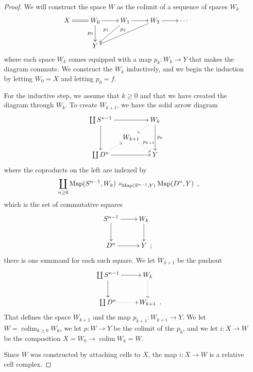 \documentclass{amsart}
\numberwithin{equation}{section}
\theoremstyle{slplain}
\theoremstyle{definition}
\theoremstyle{remark}
\DeclareMathOperator*{\colim}{colim}
\DeclareMathOperator{\Map}{Map}
\newcommand{\CofSquares}{%
  \mappullback{(S^{n-1}, W_{k})}
  {(S^{n-1}, Y)}
  {(D^{n}, Y)}%
}%
\newcommand{\pullback}[3]{#1\mathbin{\mathord{\times}_{\!#2}}#3}
\newcommand{\mappullback}[3]{\pullback{\Map#1}{\Map#2}{\Map#3}}
\newcommand{\Comma}{\rlap{\enspace ,}}
\newcommand{\Period}{\rlap{\enspace .}}
\newcommand{\Semicolon}{\rlap{\enspace ;}}
\begin{document}
\begin{proof}
  We will construct the space $W$ as the colimit of a sequence of
  spaces $W_{k}$
  \begin{displaymath}
    \xymatrix{
      {X} \ar@{=}[r]
      & {W_{0}} \ar[r] \ar[d]_{p_{0}}
      & {W_{1}} \ar[r] \ar[dl]_{p_{1}}
      & {W_{2}} \ar[r] \ar[dll]_{p_{2}}
      & {\cdots}\\
      & {Y}
    }
  \end{displaymath}
  where each space $W_{k}$ comes equipped with a map $p_{k}\colon
  W_{k} \to Y$ that makes the diagram commute.  We construct the
  $W_{k}$ inductively, and we begin the induction by letting $W_{0} =
  X$ and letting $p_{0} = f$.

  For the inductive step, we assume that $k \ge 0$ and that we have
  created the diagram through $W_{k}$.  To create $W_{k+1}$, we have
  the solid arrow diagram
  \begin{displaymath}
    \xymatrix@=1em{
      {\coprod S^{n-1}}
      \ar[rr] \ar[dd]
      && {W_{k}} \ar[dd]^{p_{k}} \ar@{..>}[dl]\\
      & {W_{k+1}} \ar@{..>}[dr]^{p_{k+1}}\\
      {\coprod D^{n}}
      \ar[rr] \ar@{..>}[ur]
      && {Y}
    }
  \end{displaymath}
  where the coproducts on the left are indexed by
  \begin{displaymath}
    \coprod_{n \ge 0} \CofSquares \Comma
  \end{displaymath}
  which is the set of commutative squares
  \begin{displaymath}
    \xymatrix{
      {S^{n-1}} \ar[r] \ar[d]
      & {W_{k}} \ar[d]\\
      {D^{n}} \ar[r]
      & {Y \Semicolon}
    }
  \end{displaymath}
  there is one summand for each such square.  We let $W_{k+1}$ be the
  pushout
  \begin{displaymath}
    \xymatrix{
      {\coprod S^{n-1}} \ar[r] \ar[d]
      & {W_{k}} \ar@{..>}[d]\\
      {\coprod D^{n}} \ar@{..>}[r]
      & {W_{k+1} \Period}
    }
  \end{displaymath}
  That defines the space $W_{k+1}$ and the map $p_{k+1}\colon W_{k+1}
  \to Y$.  We let $W = \colim_{k\ge 0} W_{k}$, we let $p\colon W \to
  Y$ be the colimit of the $p_{k}$, and we let $i\colon X \to W$ be
  the composition $X = W_{0} \to \colim W_{k} = W$.

  Since $W$ was constructed by attaching cells to $X$, the map
  $i\colon X \to W$ is a relative cell complex.


\end{proof}
\end{document}
